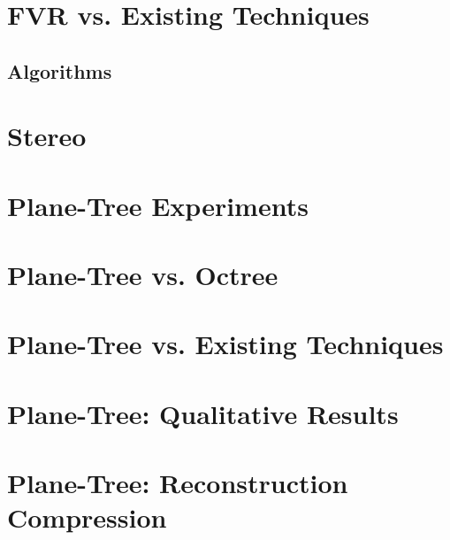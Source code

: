 \section{FVR vs. Existing Techniques}
\label{Sec:FVRSOTA}
\subsection{Algorithms} \label{AlgorithmsSection} 

\section{Stereo}




\section{Plane-Tree Experiments}

\section{Plane-Tree vs. Octree}
\label{SEC:PTVSOT}

\section{Plane-Tree vs. Existing Techniques}
\label{SEC:PTVSSOTA}

\section{Plane-Tree: Qualitative Results}
\label{SEC:PTQUALEVAL}

\section{Plane-Tree: Reconstruction Compression}
\label{SEC:PTONRECON}




